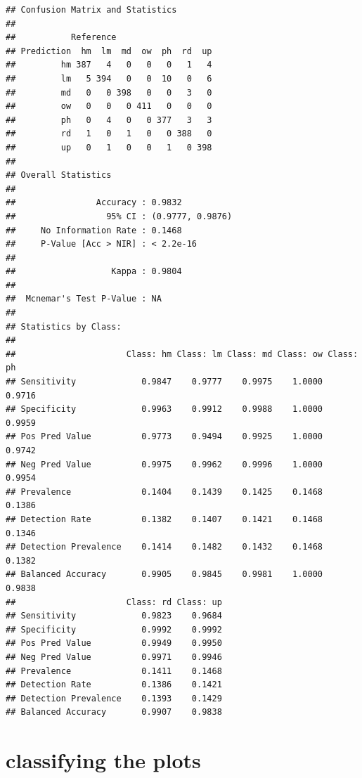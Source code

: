 \documentclass[
]{article}
\newenvironment{Shaded}{\begin{snugshade}}{\end{snugshade}}
\newcommand{\CommentTok}[1]{\textcolor[rgb]{0.56,0.35,0.01}{\textit{#1}}}
\newcommand{\FunctionTok}[1]{\textcolor[rgb]{0.13,0.29,0.53}{\textbf{#1}}}
\newcommand{\NormalTok}[1]{#1}
\newcommand{\SpecialCharTok}[1]{\textcolor[rgb]{0.81,0.36,0.00}{\textbf{#1}}}
\begin{document}
\begin{Shaded}
\end{Shaded}

\begin{verbatim}
## Confusion Matrix and Statistics
## 
##           Reference
## Prediction  hm  lm  md  ow  ph  rd  up
##         hm 387   4   0   0   0   1   4
##         lm   5 394   0   0  10   0   6
##         md   0   0 398   0   0   3   0
##         ow   0   0   0 411   0   0   0
##         ph   0   4   0   0 377   3   3
##         rd   1   0   1   0   0 388   0
##         up   0   1   0   0   1   0 398
## 
## Overall Statistics
##                                           
##                Accuracy : 0.9832          
##                  95% CI : (0.9777, 0.9876)
##     No Information Rate : 0.1468          
##     P-Value [Acc > NIR] : < 2.2e-16       
##                                           
##                   Kappa : 0.9804          
##                                           
##  Mcnemar's Test P-Value : NA              
## 
## Statistics by Class:
## 
##                      Class: hm Class: lm Class: md Class: ow Class: ph
## Sensitivity             0.9847    0.9777    0.9975    1.0000    0.9716
## Specificity             0.9963    0.9912    0.9988    1.0000    0.9959
## Pos Pred Value          0.9773    0.9494    0.9925    1.0000    0.9742
## Neg Pred Value          0.9975    0.9962    0.9996    1.0000    0.9954
## Prevalence              0.1404    0.1439    0.1425    0.1468    0.1386
## Detection Rate          0.1382    0.1407    0.1421    0.1468    0.1346
## Detection Prevalence    0.1414    0.1482    0.1432    0.1468    0.1382
## Balanced Accuracy       0.9905    0.9845    0.9981    1.0000    0.9838
##                      Class: rd Class: up
## Sensitivity             0.9823    0.9684
## Specificity             0.9992    0.9992
## Pos Pred Value          0.9949    0.9950
## Neg Pred Value          0.9971    0.9946
## Prevalence              0.1411    0.1468
## Detection Rate          0.1386    0.1421
## Detection Prevalence    0.1393    0.1429
## Balanced Accuracy       0.9907    0.9838
\end{verbatim}

\section{classifying the plots}\label{classifying-the-plots}
\end{document}
